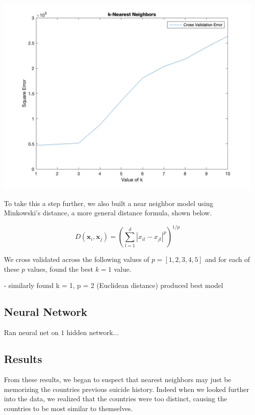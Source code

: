 \documentclass{article}
\begin{document}
\begin{multicols}{2}
\includegraphics[width=\columnwidth]{../Figures/k_nn_error_cv.png}

To take this a step further, we also built a near neighbor model using Minkowski's distance, a more general distance formula, shown below.

\[D\left(\mathbf{x}_{i}, \mathbf{x}_{j}\right)=\left(\sum_{l=1}^{d}\left|x_{i l}-x_{j l}\right|^{p}\right)^{1/p}\]

We cross validated across the following values of $p = [1, 2, 3, 4, 5]$ and for each of these $p$ values, found the best $k = 1$ value.


- similarly found k = 1, p = 2 (Euclidean distance) produced best model

\subsection{Neural Network} Ran neural net on $1$ hidden network...

\subsection{Results}
From these results, we began to suspect that nearest neighbors may just be memorizing the countries previous suicide history. Indeed when we looked further into the data, we realized that the countries were too distinct, causing the countries to be most similar to themselves. 


\end{multicols}
\end{document}

